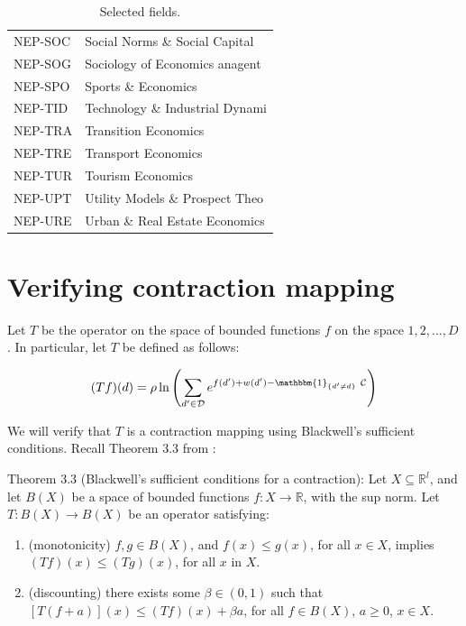 \begin{table}[!ht]
{\begin{tabular}{ll}
        NEP-SOC   & Social Norms \& Social Capital\\
        NEP-SOG   & Sociology of Economics anagent\\
        NEP-SPO   & Sports \& Economics\\
        NEP-TID   & Technology \& Industrial Dynami\\
        NEP-TRA   & Transition Economics\\
        NEP-TRE   & Transport Economics\\
        NEP-TUR   & Tourism Economics\\
        NEP-UPT   & Utility Models \& Prospect Theo\\
        NEP-URE   & Urban \& Real Estate Economics \\ \hline

    \end{tabular}}
    \caption{Selected fields.}
\end{table}

\clearpage
\section{Verifying contraction mapping}
\label{sec:contr_map}

Let $T$ be the operator on the space of bounded functions $f$ on the
space $1,2,\dots,D$. In particular, let $T$ be defined as follows:

\begin{equation}
    (Tf)(d) = \rho \ln\left( \sum_{d' \in \mathcal{D}} e^{f(d') + w(d') - \mathbbm{1}_{\{d'\neq d\}} \ \mathcal{C}} \right)    
    \label{eq:operator}
\end{equation}

We will verify that $T$ is a contraction mapping using Blackwell's
sufficient conditions. Recall Theorem 3.3 from
\citet{stokey1989recursive}:

Theorem 3.3 (Blackwell's sufficient conditions for a contraction): Let
$X \subseteq \mathbb{R}^l$, and let $B(X)$ be a space of bounded
functions $f:X\rightarrow \mathbb{R}$, with the sup norm. Let
$T: B(X) \rightarrow B(X)$ be an operator satisfying:

\begin{enumerate}
\def\labelenumi{\alph{enumi}.}
\itemsep1pt\parskip0pt
\item
  (monotonicity) $f, g \in B(X)$, and $f(x) \leq g(x)$, for all
  $x \in X$, implies $(Tf)(x) \leq (Tg)(x)$, for all $x$ in $X$.
\item
  (discounting) there exists some $\beta \in (0,1)$ such that
  $[T(f + a)](x) \leq (Tf)(x) + \beta a$, for all $f \in B(X) $,
  $a \geq 0$, $x\in X$.
\end{enumerate}

